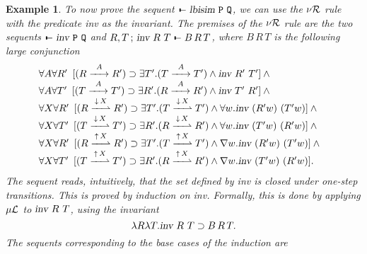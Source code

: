 \documentclass{acmtrans2m}
\newenvironment{example}{\begin{exa} \rm}{\end{exa}}
\newtheorem{exa}[theorem]{Example}
\def\Ppi{{\mathtt P}}
\def\Qpi{{\mathtt Q}}
\def\relbar{\mathrel{\smash-}}
\def\joinrelm{\mathrel{\mkern-3.2mu}}
\def\tailpiece{\kern 1pt\vrule height 1ex width 0.3ex depth -.25ex}
\def\seqsym{\mathrel{\tailpiece\joinrelm\relbar}}
\newcommand{\NSeq}[3]{#1\,;\,#2 \seqsym #3}
\newcommand{\Seq}[2]{#1\seqsym #2}
\newcommand{\lbisim}[2]{\hbox{\sl lbisim}~#1~#2}
\newcommand{\iand}{\wedge}
\newcommand{\iexists}{\exists}
\newcommand{\iforall}{\forall}
\newcommand{\iimp}{\supset}
\newcommand{\inact}{\mathop{\downarrow}}
\newcommand{\indL}{\mu {\cal L}}
\newcommand{\coindR}{\nu {\cal R}}
\newcommand{\oimp}{\supset}
\newcommand{\one  }[3]{#1\stackrel{#2}{-\!\!-\!\!\!\rightarrow    } #3}
\newcommand{\onep }[3]{#1\stackrel{#2}{-\!\!-\!\!\!\rightharpoonup} #3}
\newcommand{\outact}{\mathop{\uparrow}}
\begin{document}
\begin{example}
To now prove the sequent $\Seq{}{\lbisim{\Ppi}{\Qpi}}$, we can use 
the $\coindR$ rule with the predicate {\sl inv} as the invariant.  The
premises of the $\coindR$ rule are the two sequents $\Seq{}{\invar \Ppi \Qpi}$ and 
$\NSeq{R,T}{\invar R T}	{B\,R\,T}$, where $B\,R\,T$ is the following
large conjunction
$$
	 \begin{array}[t]{l}
	 \iforall A\iforall R'
	    \begin{array}[t]{l}
	      [(\one{R}{A}{R'})\iimp\iexists T'.(\one{T}{A}{T'})
	         \null\iand \invar{R'}{T'}]\iand\null
	    \end{array} \\
	 \iforall A\iforall T'
	    \begin{array}[t]{l}
	      [(\one{T}{A}{T'})\iimp\iexists R'.(\one{R}{A}{R'})
	         \null\iand \invar{T'}{R'}]\iand\null
	    \end{array} \\    
	 \iforall X\iforall R'
	    \begin{array}[t]{l}
	      [(\onep{R}{\inact X}{R'})\iimp\iexists T'.(\onep{T}{\inact X}{T'})
	          \null\iand\iforall w.\invar{(R' w)}{(T' w)}]\iand\null
	    \end{array} \\
	 \iforall X\iforall T'
	    \begin{array}[t]{l}
	      [(\onep{T}{\inact X}{T'})\iimp\iexists R'.(\onep{R}{\inact X}{R'})
	          \null\iand\iforall w.\invar{(T' w)}{(R' w)}]\iand\null
	    \end{array} \\    
	 \iforall X \iforall R'
	    \begin{array}[t]{l}
	      [(\onep{R}{\outact X}{R'})\iimp\iexists T'.(\onep{T}{\outact X}{T'})
	         \null\iand\nabla w. \invar{(R' w)}{(T' w)}]\iand\null
	    \end{array}\\
	 \iforall X \iforall T'
	    \begin{array}[t]{l}
	      [(\onep{T}{\outact X}{T'})\iimp\iexists R'.(\onep{R}{\outact X}{R'})
	         \null\iand\nabla w. \invar{(T' w)}{(R' w)}].\quad
	    \end{array}    
	  \end{array}
$$
The sequent reads, intuitively, that the set defined by {\sl inv} 
is closed under one-step transitions. This is proved by induction on
{\sl inv}. Formally, this is done by applying $\indL$ to 
${\hbox{\sl inv}~R~T}$, using the invariant 
$$\lambda R\lambda T.\invar{R}{T} \oimp B\,R\,T.$$ 
The sequents corresponding to the base cases of the induction are

\end{example}
\end{document}

